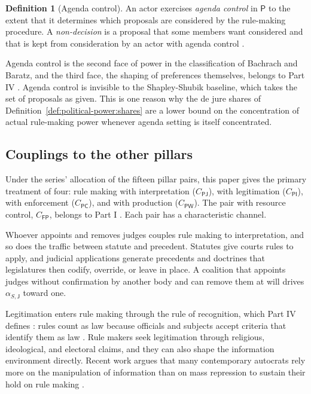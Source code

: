 \documentclass[11pt,letterpaper]{article}
\theoremstyle{definition}
\newtheorem{definition}[theorem]{Definition}
\theoremstyle{remark}
\newcommand{\pF}{\mathsf{F}}
\newcommand{\pP}{\mathsf{P}}
\newcommand{\pJ}{\mathsf{J}}
\newcommand{\pI}{\mathsf{I}}
\newcommand{\pC}{\mathsf{C}}
\newcommand{\pW}{\mathsf{W}}
\begin{document}
\begin{definition}[Agenda control]
\label{def:political-power:agenda-control}
An actor exercises \emph{agenda control} in $\pP$ to the extent that it determines which proposals are considered by the rule-making procedure. A \emph{non-decision} is a proposal that some members want considered and that is kept from consideration by an actor with agenda control \citep{bachrach1962}.
\end{definition}

Agenda control is the second face of power in the classification of Bachrach and Baratz, and the third face, the shaping of preferences themselves, belongs to Part IV \citep{lukes2005}. Agenda control is invisible to the Shapley-Shubik baseline, which takes the set of proposals as given. This is one reason why the de jure shares of Definition~\ref{def:political-power:shares} are a lower bound on the concentration of actual rule-making power whenever agenda setting is itself concentrated.

\subsection{Couplings to the other pillars}

Under the series' allocation of the fifteen pillar pairs, this paper gives the primary treatment of four: rule making with interpretation ($C_{\pP\pJ}$), with legitimation ($C_{\pP\pI}$), with enforcement ($C_{\pP\pC}$), and with production ($C_{\pP\pW}$). The pair with resource control, $C_{\pF\pP}$, belongs to Part I \citep{long2026financial}. Each pair has a characteristic channel.

Whoever appoints and removes judges couples rule making to interpretation, and so does the traffic between statute and precedent. Statutes give courts rules to apply, and judicial applications generate precedents and doctrines that legislatures then codify, override, or leave in place. A coalition that appoints judges without confirmation by another body and can remove them at will drives $\alpha_{S,\pJ}$ toward one.

Legitimation enters rule making through the rule of recognition, which Part IV defines \citep[Definition~2.2]{long2026ideological}: rules count as law because officials and subjects accept criteria that identify them as law \citep{hart1961}. Rule makers seek legitimation through religious, ideological, and electoral claims, and they can also shape the information environment directly. Recent work argues that many contemporary autocrats rely more on the manipulation of information than on mass repression to sustain their hold on rule making \citep{guriev2019}.
\end{document}
